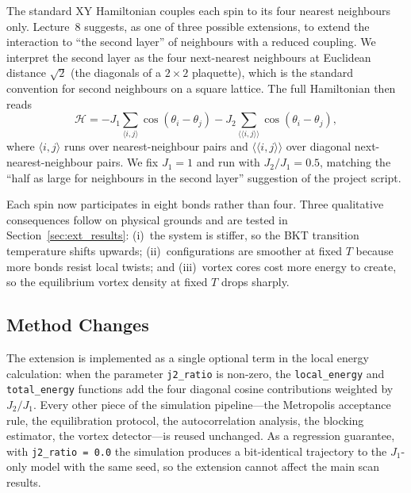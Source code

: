 \documentclass[11pt,a4paper]{article}
\begin{document}
The standard XY Hamiltonian couples each spin to its four nearest neighbours only. Lecture~8 suggests, as one of three possible extensions, to extend the interaction to ``the second layer'' of neighbours with a reduced coupling. We interpret the second layer as the four next-nearest neighbours at Euclidean distance $\sqrt{2}$ (the diagonals of a $2 \times 2$ plaquette), which is the standard convention for second neighbours on a square lattice. The full Hamiltonian then reads
\begin{equation}
\mathcal{H} = -J_1 \sum_{\langle i,j \rangle}
                  \cos(\theta_i - \theta_j)
              -J_2 \sum_{\langle\langle i,j \rangle\rangle}
                  \cos(\theta_i - \theta_j),
\label{eq:hamiltonian_j2}
\end{equation}
where $\langle i,j \rangle$ runs over nearest-neighbour pairs and $\langle\langle i,j \rangle\rangle$ over diagonal next-nearest-neighbour pairs. We fix $J_1 = 1$ and run with $J_2 / J_1 = 0.5$, matching the ``half as large for neighbours in the second layer'' suggestion of the project script.

Each spin now participates in eight bonds rather than four. Three qualitative consequences follow on physical grounds and are tested in Section~\ref{sec:ext_results}: (i)~the system is stiffer, so the BKT transition temperature shifts upwards; (ii)~configurations are smoother at fixed $T$ because more bonds resist local twists; and (iii)~vortex cores cost more energy to create, so the equilibrium vortex density at fixed $T$ drops sharply.

\subsection{Method Changes}
\label{sec:ext_method}

The extension is implemented as a single optional term in the local energy calculation: when the parameter \texttt{j2\_ratio} is non-zero, the
\texttt{local\_energy} and \texttt{total\_energy} functions add the four
diagonal cosine contributions weighted by $J_2/J_1$. Every other piece of the simulation pipeline---the Metropolis acceptance rule, the equilibration protocol, the autocorrelation analysis, the blocking estimator, the vortex detector---is reused unchanged. As a regression guarantee, with
\texttt{j2\_ratio = 0.0} the simulation produces a bit-identical trajectory
to the $J_1$-only model with the same seed, so the extension cannot affect the main scan results.
\end{document}
